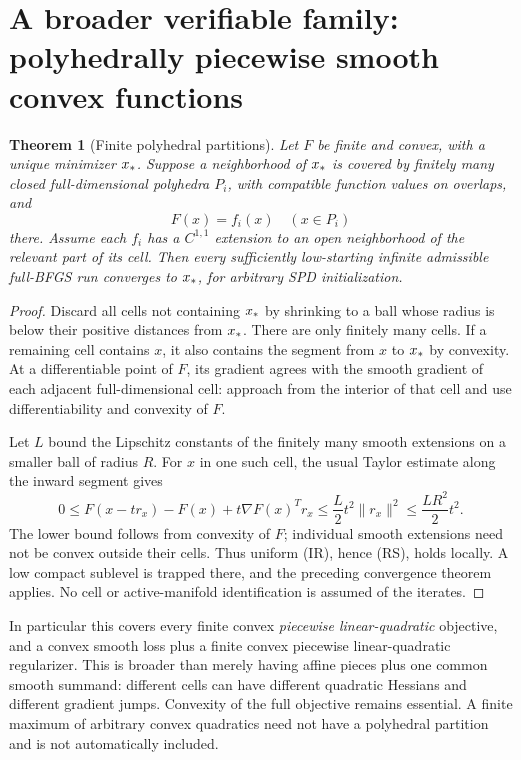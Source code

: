 \documentclass[10pt,oneside,openany]{book}
\newtheorem{theorem}{Theorem}[chapter]
\theoremstyle{remark}\newtheorem{remark}{Remark}[chapter]
\begin{document}
\section{A broader verifiable family: polyhedrally piecewise smooth convex functions}
\begin{theorem}[Finite polyhedral partitions]\label{R:thm:plq}
Let $F$ be finite and convex, with a unique minimizer $x_*$. Suppose a neighborhood of $x_*$ is covered by finitely many closed full-dimensional polyhedra $P_i$, with compatible function values on overlaps, and
\[
 F(x)=f_i(x)\quad(x\in P_i)
\]
there. Assume each $f_i$ has a $C^{1,1}$ extension to an open neighborhood of the relevant part of its cell. Then every sufficiently low-starting infinite admissible full-BFGS run converges to $x_*$, for arbitrary SPD initialization.
\end{theorem}
\begin{proof}
Discard all cells not containing $x_*$ by shrinking to a ball whose radius is below their positive distances from $x_*$. There are only finitely many cells. If a remaining cell contains $x$, it also contains the segment from $x$ to $x_*$ by convexity. At a differentiable point of $F$, its gradient agrees with the smooth gradient of each adjacent full-dimensional cell: approach from the interior of that cell and use differentiability and convexity of $F$.

Let $L$ bound the Lipschitz constants of the finitely many smooth extensions on a smaller ball of radius $R$. For $x$ in one such cell, the usual Taylor estimate along the inward segment gives
\[
 0\le F(x-t r_x)-F(x)+t\nabla F(x)^Tr_x
 \le\frac L2 t^2\|r_x\|^2\le\frac{LR^2}{2}t^2.
\]
The lower bound follows from convexity of $F$; individual smooth extensions need not be convex outside their cells. Thus uniform (IR), hence (RS), holds locally. A low compact sublevel is trapped there, and the preceding convergence theorem applies. No cell or active-manifold identification is assumed of the iterates.
\end{proof}
In particular this covers every finite convex \emph{piecewise linear-quadratic} objective, and a convex smooth loss plus a finite convex piecewise linear-quadratic regularizer. This is broader than merely having affine pieces plus one common smooth summand: different cells can have different quadratic Hessians and different gradient jumps. Convexity of the full objective remains essential. A finite maximum of arbitrary convex quadratics need not have a polyhedral partition and is not automatically included.
\end{document}
